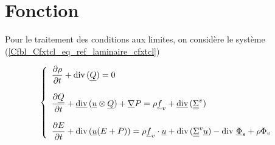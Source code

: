 
%
%
%
%



\hypertarget{cfxtcl}{}

\vspace{1cm}
\section*{Fonction}

Pour le traitement des conditions aux limites, on considère
le système (\ref{Cfbl_Cfxtcl_eq_ref_laminaire_cfxtcl})

\begin{equation}\label{Cfbl_Cfxtcl_eq_ref_laminaire_cfxtcl}
\left\{\begin{array}{l}

\displaystyle\frac{\partial\rho}{\partial t} + \text{div}\,(\underline{Q}) = 0 \\
\\
\displaystyle\frac{\partial\underline{Q}}{\partial t}
+ \underline{\text{div}}\,(\underline{u} \otimes \underline{Q}) + \underline{\nabla}{P}
= \rho \underline{f}_v + \underline{\text{div}}\,(\underline{\underline{\Sigma}}^v) \\
\\
\displaystyle\frac{\partial E}{\partial t} + \text{div}\,( \underline{u} (E+P) )
= \rho\underline{f}_v\cdot\underline{u} + \text{div}\,(\underline{\underline{\Sigma}}^v \underline{u})
- \text{div}\,{\,\underline{\Phi}_s} + \rho\Phi_v

\end{array}\right.
\end{equation}

